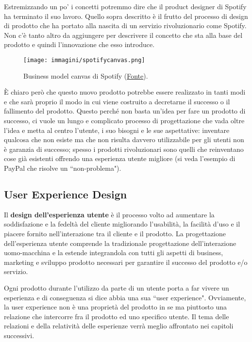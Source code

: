 Estremizzando un po' i concetti potremmo dire che il product designer di Spotify ha terminato il suo lavoro. Quello sopra descritto è il frutto del
processo di design di prodotto che ha portato alla nascita di un servizio rivoluzionario come Spotify. Non c'è tanto altro da aggiungere per descrivere
il concetto che sta alla base del prodotto e quindi l'innovazione che esso introduce.

\begin{figure}[!h]
	\centering
	\texttt{[image: immagini/spotifycanvas.png]}
	\caption{Business model canvas di Spotify (\href{http://lumosbusiness.com/business-model-canvas-spotify/}{Fonte}).}
\end{figure}

\`E chiaro però che questo nuovo prodotto potrebbe essere realizzato in tanti modi e che sarà proprio il modo in cui viene costruito a decretarne il
successo o il fallimento del prodotto. Questo perché non basta un'idea per fare un prodotto di successo, ci vuole un lungo e complicato processo di
progettazione che vada oltre l'idea e metta al centro l'utente, i suo bisogni e le sue aspettative: inventare qualcosa che non esiste ma che non
risulta davvero utilizzabile per gli utenti non è garanzia di successo; spesso i prodotti rivoluzionari sono quelli che reinventano cose già
esistenti offrendo una esperienza utente migliore (si veda l'esempio di PayPal che risolve un ``non-problema").

\subsection{User Experience Design}
Il \textbf{design dell'esperienza utente} è il processo volto ad aumentare la soddisfazione e la fedeltà del cliente migliorando l'usabilità, la
facilità d'uso e il piacere fornito nell'interazione tra il cliente e il prodotto. La progettazione dell'esperienza utente comprende la tradizionale
progettazione dell'interazione uomo-macchina e la estende integrandola con tutti gli aspetti di business, marketing e sviluppo prodotto necessari per
garantire il successo del prodotto e/o servizio.


Ogni prodotto durante l'utilizzo da parte di un utente porta a far vivere un esperienza e di conseguenza si dice abbia una sua ``user experience".
Ovviamente, la user experience non è una proprietà del prodotto in se ma piuttosto una relazione che intercorre fra il prodotto ed uno specifico utente.
Il tema delle relazioni e della relatività delle esperienze verrà meglio affrontato nei capitoli successivi. 

